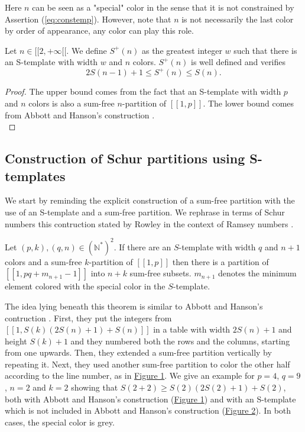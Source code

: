 \documentclass[final,onefignum,onetabnum]{siamart190516}
\begin{document}
Here \(n\) can be seen as a "special" color in the sense that it is not constrained by Assertion (\ref{eq:constemp}).
However, note that \(n\) is not necessarily the last color by order of appearance, any color can play this role.


\begin{proposition}
	Let \(n \in [\![2, +\infty[\![\). We define \(S^+(n)\) as the greatest integer \(w\) such that there is an S-template with 
	width \(w\) and \(n\) colors. 
	\(S^+(n)\) is well defined and verifies
	\[
	2S(n-1)+1 \leqslant S^+(n) \leqslant S(n).
	\]
\end{proposition}

\begin{proof}
The upper bound comes from the fact that an S-template with width \(p\) and \(n\) colors is also a sum-free \(n\)-partition 
of \([\![1, p]\!]\). The lower bound comes from Abbott and Hanson's construction \cite{AbbottHanson}. \\
\end{proof}


\subsection{Construction of Schur partitions using S-templates}

We start by reminding the explicit construction of a sum-free partition with the use of an S-template and a sum-free partition. 
We rephrase in terms of Schur numbers this contruction stated by Rowley in the context of Ramsey numbers \cite{RowleyRamsey}.

\begin{theorem}
\label{thm:Stemp}
	Let \((p,k), (q,n) \in (\mathbb{N}^*)^2\). If there are an \(S\)-template with width \(q\) and \(n+1\) colors 
	and a sum-free \(k\)-partition of \([\![1,p]\!]\) then there is a partition of \([\![1,pq+m_{n+1}
	-1]\!]\) into \(n+k\) sum-free subsets. \(m_{n+1}\) denotes the minimum element colored with the special color in the \(S\)-template.
\end{theorem}

The idea lying beneath this theorem is similar to Abbott and Hanson's contruction \cite{AbbottHanson}. First, they
put the integers from \([\![1,S(k)(2S(n)+1)+S(n)]\!]\) in a table with width \(2S(n)+1\) and height \(S(k)+1\) and they 
numbered both the rows and the columns, starting from one upwards. Then, they 
extended a sum-free partition vertically by repeating it. Next, they used another sum-free partition to color the other half according 
to the line number, as in \hyperref[figure:1]{Figure 1}. We give an example for \(p = 4\), 
\(q = 9\), \(n = 2\) and \(k = 2\) showing that \(S(2 + 2) \geqslant S(2) \left(2 S(2) + 1\right) + S(2)\), both with Abbott and 
Hanson's construction (\hyperref[figure:1]{Figure 1}) and with an S-template which is not included in Abbott and Hanson's construction 
(\hyperref[figure:2]{Figure 2}). In both cases, the special color is grey.
\end{document}
